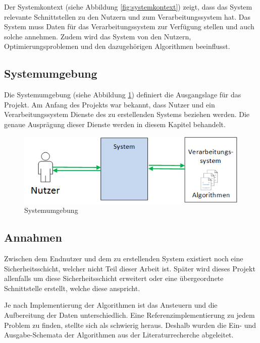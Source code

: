 Der Systemkontext (siehe Abbildung \ref{fig:systemkontext}) zeigt, dass das System relevante Schnittstellen zu den Nutzern und zum Verarbeitungssystem hat. Das System muss Daten 
für das Verarbeitungssystem zur Verfügung stellen und auch solche annehmen. Zudem wird das System von den Nutzern, Optimierungsproblemen und den dazugehörigen Algorithmen 
beeinflusst.

\FloatBarrier
\subsection{Systemumgebung}\label{systemumgebung}
Die Systemumgebung (siehe Abbildung \ref{fig:systemumgebung}) definiert die Ausgangslage für das Projekt. Am Anfang des Projekts war bekannt, dass Nutzer und ein Verarbeitungssystem 
Dienste des zu erstellenden Systems beziehen werden. Die genaue Ausprägung dieser Dienste werden in diesem Kapitel behandelt.

\begin{figure}[h]
\centering
\includegraphics[scale=0.8]{images/visio/systemumgebung.png}
\caption[Systemumgebung]{Systemumgebung \selfmade{}}
\label{fig:systemumgebung}
\end{figure}

\FloatBarrier
\subsection{Annahmen}\label{annahmen}
Zwischen dem Endnutzer und dem zu erstellenden System existiert noch eine Sicherheitsschicht, welcher nicht Teil dieser Arbeit ist. Später wird dieses Projekt allenfalls um diese Sicherheitsschicht 
erweitert oder eine übergeordnete Schnittstelle erstellt, welche diese anspricht. 

Je nach Implementierung der Algorithmen ist das Ansteuern und die Aufbereitung der Daten unterschiedlich. Eine Referenzimplementierung zu jedem Problem zu finden, stellte sich als schwierig 
heraus. Deshalb wurden die Ein- und Ausgabe-Schemata der Algorithmen aus der Literaturrecherche abgeleitet.

\newpage
